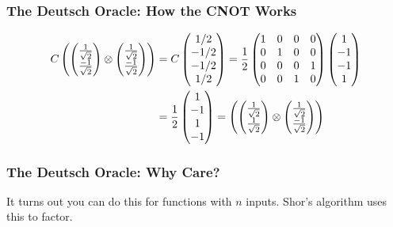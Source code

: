 \documentclass{beamer}
\begin{document}
\begin{frame}
\frametitle{The Deutsch Oracle: How the CNOT Works}

\begin{align*}
    C \left(\begin{pmatrix}{1 \over \sqrt{2}} \\{-1 \over \sqrt{2}}\end{pmatrix}
        \otimes \begin{pmatrix}{1 \over \sqrt{2}} \\{-1 \over \sqrt{2}}\end{pmatrix}\right)
    &= C \begin{pmatrix}1/2 \\ -1/2 \\ -1/2 \\ 1/2 \end{pmatrix}
    = {1 \over 2}
        \begin{pmatrix}
        1 & 0 & 0 & 0 \\
        0 & 1 & 0 & 0 \\
        0 & 0 & 0 & 1 \\
        0 & 0 & 1 & 0 \\
        \end{pmatrix}
        \begin{pmatrix}1 \\ -1 \\ -1 \\ 1 \end{pmatrix}\\
    &= {1 \over 2}
        \begin{pmatrix}1 \\ -1 \\ 1 \\ -1 \end{pmatrix}
    = \left(\begin{pmatrix}{1 \over \sqrt{2}} \\{1 \over \sqrt{2}}\end{pmatrix}
        \otimes \begin{pmatrix}{1 \over \sqrt{2}} \\{-1 \over \sqrt{2}}\end{pmatrix}\right)
\end{align*}

\end{frame}

\begin{frame}
\frametitle{The Deutsch Oracle: Why Care?}
It turns out you can do this for functions with $n$ inputs.
Shor's algorithm uses this to factor.
\end{frame}
\end{document}
